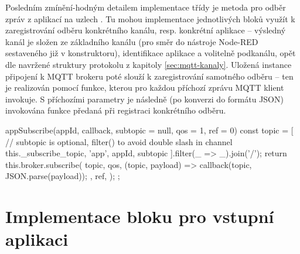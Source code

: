 Posledním zmínění-hodným detailem implementace třídy  je metoda pro odběr zpráv z aplikací na uzlech
.
Tu mohou implementace jednotlivých bloků využít k zaregistrování odběru konkrétního kanálu, resp. konkrétní aplikace
-- výsledný kanál je složen ze základního kanálu (pro směr do nástroje Node-RED sestaveného již v konstruktoru),
identifikace aplikace  a volitelně podkanálu, opět dle navržené struktury protokolu z kapitoly
\ref{sec:mqtt-kanaly}.
Uložená instance připojení k MQTT brokeru poté slouží k zaregistrování samotného odběru -- ten je realizován pomocí
funkce, kterou pro každou příchozí zprávu MQTT klient invokuje.
S příchozími parametry je následně (po konverzi do formátu JSON) invokována funkce předaná při registraci konkrétního
odběru.

\begin{code}[
    language=Javascript,
    label=code:fis-node-app-subscribe,
    caption={Detail z implementace třídy \ic{FisNode} -- metoda \ic{appSubscribe} je určená k zaregistrování odběru
    kanálu odpovídajícího konkrétní aplikaci na konkrétním uzlu.
    Parametr \ic{qos} slouží k nastavení konkrétní QoS pro tento odběr, \ic{ref} je poté volitelná identifikace odběru,
    lze pomocí ní poté mazat konkrétní odběry.}
]
appSubscribe(appId, callback, subtopic = null, qos = 1, ref = 0) {
    const topic = [
        // subtopic is optional, filter() to avoid double slash in channel
        this._subscribe_topic, 'app', appId, subtopic
    ].filter(_ => _).join('/');
    return this.broker.subscribe(
        topic,
        qos,
        (topic, payload) => {
            callback(topic, JSON.parse(payload));
        },
        ref,
    );
};
\end{code}

\section{Implementace bloku pro vstupní aplikaci}\label{sec:implementace-bloku-pro-vstupni-aplikaci}

